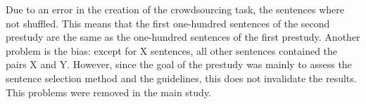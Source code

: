 Due to an error in the creation of the crowdsourcing task, the sentences where not shuffled. This means that the first one-hundred sentences of the second prestudy are the same as the one-hundred sentences of the first prestudy. Another problem is the bias: except for X sentences, all other sentences contained the pairs X and Y. However, since the goal of the prestudy was mainly to assess the sentence selection method and the guidelines, this does not invalidate the results. This problems were removed in the main study.
%
%
%
%
%
%
%
%
%
%
%
%
%
%

